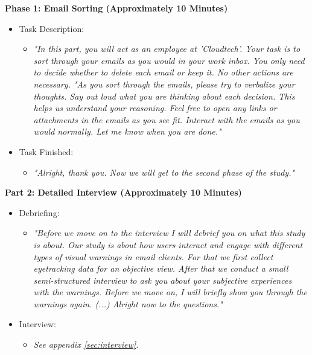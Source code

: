 \documentclass[
  a4paper,  %
  twoside,  %
  bibliography=totoc,
  headsepline,
  cleardoublepage=empty,
  parskip=half,
  draft=false
]{scrbook}
\begin{document}
\textbf{Phase 1: Email Sorting (Approximately 10 Minutes)}
\begin{itemize}
    \item Task Description:
        \begin{itemize}
            \item[] \textit{"In this part, you will act as an employee at 'Cloudtech'. Your task is to sort through your emails as you would in your work inbox. You only need to decide whether to delete each email or keep it. No other actions are necessary. "As you sort through the emails, please try to verbalize your thoughts. Say out loud what you are thinking about each decision. This helps us understand your reasoning. Feel free to open any links or attachments in the emails as you see fit. Interact with the emails as you would normally. Let me know when you are done."}
        \end{itemize}
    \item Task Finished:
        \begin{itemize}
            \item[] \textit{"Alright, thank you. Now we will get to the second phase of the study."}
        \end{itemize}
\end{itemize}

\textbf{Part 2: Detailed Interview (Approximately 10 Minutes)}
\begin{itemize}
    \item Debriefing:
        \begin{itemize}
            \item[] \textit{"Before we move on to the interview I will debrief you on what this study is about. Our study is about how users interact and engage with different types of visual warnings in email clients. For that we first collect eyetracking data for an objective view. After that we conduct a small semi-structured interview to ask you about your subjective experiences with the warnings. Before we move on, I will briefly show you through the warnings again. (...) Alright now to the questions."}
        \end{itemize}
    \item Interview: 
        \begin{itemize}
            \item[] \textit{See appendix \ref{sec:interview}.}
        \end{itemize}
    
\end{itemize}
\end{document}
